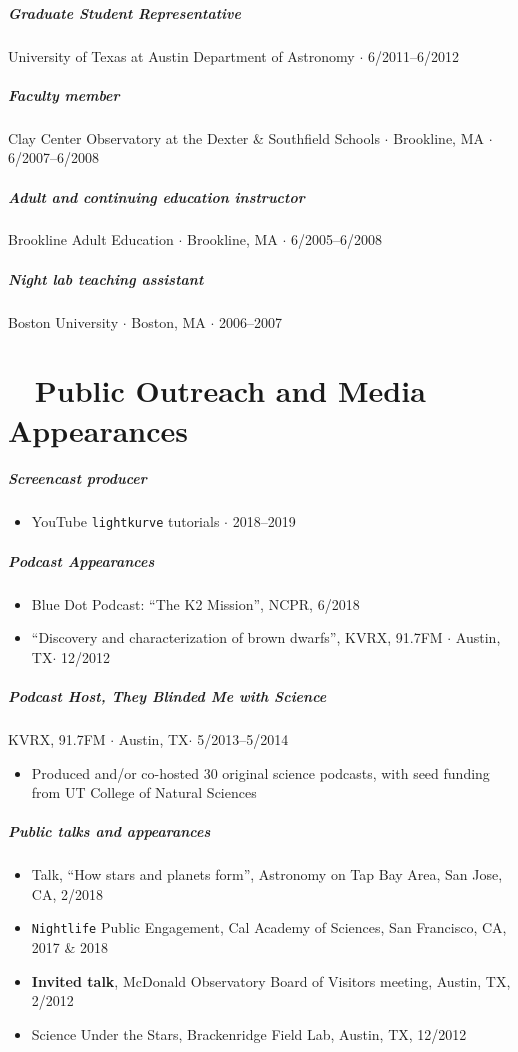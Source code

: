 \documentclass[10pt,letterpaper]{article}
\begin{document}
\subparagraph{Graduate Student Representative}
University of Texas at Austin Department of Astronomy $\cdot$ 6/2011--6/2012

\subparagraph{Faculty member}
Clay Center Observatory at the Dexter \& Southfield Schools  $\cdot$ Brookline, MA $\cdot$ 6/2007--6/2008

\subparagraph{Adult and continuing education instructor}
Brookline Adult Education  $\cdot$ Brookline, MA $\cdot$ 6/2005--6/2008

\subparagraph{Night lab teaching assistant}
Boston University $\cdot$ Boston, MA $\cdot$ 2006--2007

\section*{\faYoutube ~ Public Outreach and Media Appearances}

\subparagraph{Screencast producer}
	\begin{itemize}
      \item YouTube \texttt{lightkurve} tutorials $\cdot$ 2018--2019
	\end{itemize}


\subparagraph{Podcast Appearances}
	\begin{itemize}
      \item Blue Dot Podcast: ``The K2 Mission'', NCPR, 6/2018
      \item ``Discovery and characterization of brown dwarfs'', KVRX, 91.7FM $\cdot$ Austin, TX$\cdot$ 12/2012
	\end{itemize}

\subparagraph{Podcast Host, \emph{They Blinded Me with Science} }
KVRX, 91.7FM $\cdot$ Austin, TX$\cdot$ 5/2013--5/2014
	\begin{itemize}
	    \item Produced and/or co-hosted 30 original science podcasts, with seed funding from UT College of Natural Sciences
	\end{itemize}

\subparagraph{Public talks and appearances}
	\begin{itemize}
    \item Talk, ``How stars and planets form'', Astronomy on Tap Bay Area, San Jose, CA, 2/2018
    \item \texttt{Nightlife} Public Engagement, Cal Academy of Sciences, San Francisco, CA, 2017 \& 2018
    \item \textbf{Invited talk}, McDonald Observatory Board of Visitors meeting, Austin, TX, 2/2012
    \item Science Under the Stars, Brackenridge Field Lab, Austin, TX, 12/2012
	\end{itemize}
\end{document}
